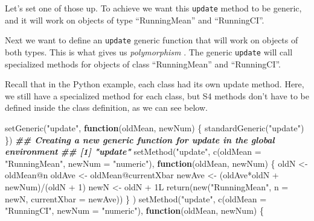 \documentclass[
  12pt,
  krantz2]{krantz}
\makeatletter
\newenvironment{Shaded}{\begin{snugshade}}{\end{snugshade}}
\newcommand{\AttributeTok}[1]{\textcolor[rgb]{0.61,0.61,0.61}{#1}}
\newcommand{\ControlFlowTok}[1]{\textcolor[rgb]{0.27,0.27,0.27}{\textbf{#1}}}
\newcommand{\DecValTok}[1]{\textcolor[rgb]{0.06,0.06,0.06}{#1}}
\newcommand{\DocumentationTok}[1]{\textcolor[rgb]{0.37,0.37,0.37}{\textbf{\textit{#1}}}}
\newcommand{\FunctionTok}[1]{\textcolor[rgb]{0,0,0}{#1}}
\newcommand{\NormalTok}[1]{#1}
\newcommand{\OtherTok}[1]{\textcolor[rgb]{0.37,0.37,0.37}{#1}}
\newcommand{\SpecialCharTok}[1]{\textcolor[rgb]{0,0,0}{#1}}
\newcommand{\StringTok}[1]{\textcolor[rgb]{0.5,0.5,0.5}{#1}}
\newenvironment{kframe}{%
\medskip{}
\setlength{\fboxsep}{.8em}
 \def\at@end@of@kframe{}%
 \ifinner\ifhmode%
  \def\at@end@of@kframe{\end{minipage}}%
  \begin{minipage}{\columnwidth}%
 \fi\fi%
 \def\FrameCommand##1{\hskip\@totalleftmargin \hskip-\fboxsep
 \colorbox{shadecolor}{##1}\hskip-\fboxsep
     \hskip-\linewidth \hskip-\@totalleftmargin \hskip\columnwidth}%
 \MakeFramed {\advance\hsize-\width
   \@totalleftmargin\z@ \linewidth\hsize
   \@setminipage}}%
 {\par\unskip\endMakeFramed%
 \at@end@of@kframe}
\renewenvironment{Shaded}{\begin{kframe}}{\end{kframe}}
\makeatother
\begin{document}
Let's set one of those up. To achieve we want this \texttt{update} method to be generic, and it will work on objects of type ``RunningMean'' and ``RunningCI''.

Next we want to define an \texttt{update} generic function that will work on objects of both types. This is what gives us \emph{polymorphism} . The generic \texttt{update} will call specialized methods for objects of class ``RunningMean'' and ``RunningCI''.

Recall that in the Python example, each class had its own update method. Here, we still have a specialized method for each class, but S4 methods don't have to be defined inside the class definition, as we can see below.

\begin{Shaded}
\begin{Highlighting}[]
\FunctionTok{setGeneric}\NormalTok{(}\StringTok{"update"}\NormalTok{, }\ControlFlowTok{function}\NormalTok{(oldMean, newNum) \{}
  \FunctionTok{standardGeneric}\NormalTok{(}\StringTok{"update"}\NormalTok{)}
\NormalTok{\})}
\DocumentationTok{\#\# Creating a new generic function for \textquotesingle{}update\textquotesingle{} in the global environment}
\DocumentationTok{\#\# [1] "update"}
\FunctionTok{setMethod}\NormalTok{(}\StringTok{"update"}\NormalTok{,}
          \FunctionTok{c}\NormalTok{(}\AttributeTok{oldMean =} \StringTok{"RunningMean"}\NormalTok{, }\AttributeTok{newNum =} \StringTok{"numeric"}\NormalTok{),}
          \ControlFlowTok{function}\NormalTok{(oldMean, newNum) \{}
\NormalTok{            oldN }\OtherTok{\textless{}{-}}\NormalTok{ oldMean}\SpecialCharTok{@}\NormalTok{n}
\NormalTok{            oldAve }\OtherTok{\textless{}{-}}\NormalTok{ oldMean}\SpecialCharTok{@}\NormalTok{currentXbar}
\NormalTok{            newAve }\OtherTok{\textless{}{-}}\NormalTok{ (oldAve}\SpecialCharTok{*}\NormalTok{oldN }\SpecialCharTok{+}\NormalTok{ newNum)}\SpecialCharTok{/}\NormalTok{(oldN }\SpecialCharTok{+} \DecValTok{1}\NormalTok{)}
\NormalTok{            newN }\OtherTok{\textless{}{-}}\NormalTok{ oldN }\SpecialCharTok{+}\NormalTok{ 1L}
            \FunctionTok{return}\NormalTok{(}\FunctionTok{new}\NormalTok{(}\StringTok{"RunningMean"}\NormalTok{, }\AttributeTok{n =}\NormalTok{ newN, }\AttributeTok{currentXbar =}\NormalTok{ newAve))}
\NormalTok{          \}}
\NormalTok{)}
\FunctionTok{setMethod}\NormalTok{(}\StringTok{"update"}\NormalTok{,}
          \FunctionTok{c}\NormalTok{(}\AttributeTok{oldMean =} \StringTok{"RunningCI"}\NormalTok{, }\AttributeTok{newNum =} \StringTok{"numeric"}\NormalTok{),}
          \ControlFlowTok{function}\NormalTok{(oldMean, newNum) \{}

\end{Highlighting}
\end{Shaded}
\end{document}
